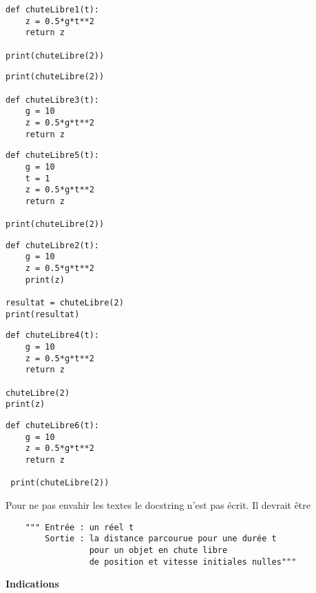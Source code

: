 \medskip

\begin{minipage}{0.48\textwidth}
\begin{lstlisting}
def chuteLibre1(t):
    z = 0.5*g*t**2 
    return z  

print(chuteLibre(2))  
\end{lstlisting}

\begin{lstlisting}
print(chuteLibre(2))
                                       
def chuteLibre3(t):       
    g = 10               
    z = 0.5*g*t**2   
    return z           
\end{lstlisting}

\begin{lstlisting}
def chuteLibre5(t):
    g = 10 
    t = 1 
    z = 0.5*g*t**2  
    return z 

print(chuteLibre(2))  
\end{lstlisting}
\end{minipage}
\begin{minipage}{0.48\textwidth}
\begin{lstlisting}
def chuteLibre2(t):
    g = 10
    z = 0.5*g*t**2
    print(z)

resultat = chuteLibre(2)
print(resultat)
\end{lstlisting}

\begin{lstlisting}
def chuteLibre4(t):
    g = 10
    z = 0.5*g*t**2
    return z

chuteLibre(2)
print(z)
\end{lstlisting}

\begin{lstlisting}
def chuteLibre6(t):
    g = 10
    z = 0.5*g*t**2
    return z 
    
 print(chuteLibre(2))  
\end{lstlisting}
\end{minipage}

Pour ne pas envahir les textes le docstring n'est pas écrit. Il devrait être
\begin{lstlisting}
    """ Entrée : un réel t
        Sortie : la distance parcourue pour une durée t 
                 pour un objet en chute libre
                 de position et vitesse initiales nulles"""
\end{lstlisting}
{\bf Indications}

